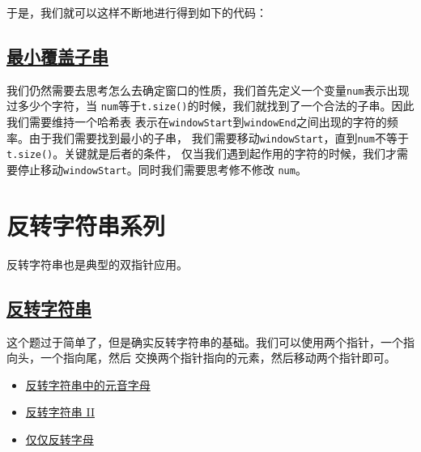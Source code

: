 \documentclass[../../main.tex]{subfiles}
\begin{document}
于是，我们就可以这样不断地进行得到如下的代码：



\subsection{\href{https://leetcode.cn/problems/minimum-window-substring/}{最小覆盖子串}}

我们仍然需要去思考怎么去确定窗口的性质，我们首先定义一个变量\texttt{num}表示出现过多少个字符，当
\texttt{num}等于\texttt{t.size()}的时候，我们就找到了一个合法的子串。因此我们需要维持一个哈希表
表示在\texttt{windowStart}到\texttt{windowEnd}之间出现的字符的频率。由于我们需要找到最小的子串，
我们需要移动\texttt{windowStart}，直到\texttt{num}不等于\texttt{t.size()}。关键就是后者的条件，
仅当我们遇到起作用的字符的时候，我们才需要停止移动\texttt{windowStart}。同时我们需要思考修不修改
\texttt{num}。



\section{反转字符串系列}

反转字符串也是典型的双指针应用。

\subsection{\href{https://leetcode.cn/problems/reverse-string/}{反转字符串}}

这个题过于简单了，但是确实反转字符串的基础。我们可以使用两个指针，一个指向头，一个指向尾，然后
交换两个指针指向的元素，然后移动两个指针即可。



\begin{kaobox}[title=类似题目]
  \begin{itemize}
    \item \href{https://leetcode.cn/problems/reverse-vowels-of-a-string/}{反转字符串中的元音字母}
    \item \href{https://leetcode.cn/problems/reverse-string-ii/}{反转字符串 II}
    \item \href{https://leetcode.cn/problems/reverse-only-letters/}{仅仅反转字母}
  \end{itemize}
\end{kaobox}
\end{document}
